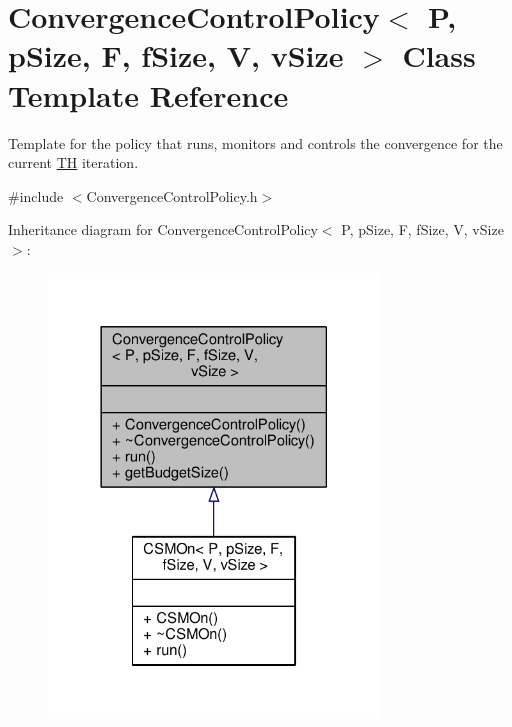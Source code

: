 \hypertarget{classConvergenceControlPolicy}{}\section{Convergence\+Control\+Policy$<$ P, p\+Size, F, f\+Size, V, v\+Size $>$ Class Template Reference}
\label{classConvergenceControlPolicy}


Template for the policy that runs, monitors and controls the convergence for the current \hyperlink{classTH}{TH} iteration.  




{\ttfamily \#include $<$Convergence\+Control\+Policy.\+h$>$}



Inheritance diagram for Convergence\+Control\+Policy$<$ P, p\+Size, F, f\+Size, V, v\+Size $>$\+:
\nopagebreak
\begin{figure}[H]
\begin{center}
\leavevmode
\includegraphics[width=249pt]{classConvergenceControlPolicy__inherit__graph}
\end{center}
\end{figure}



